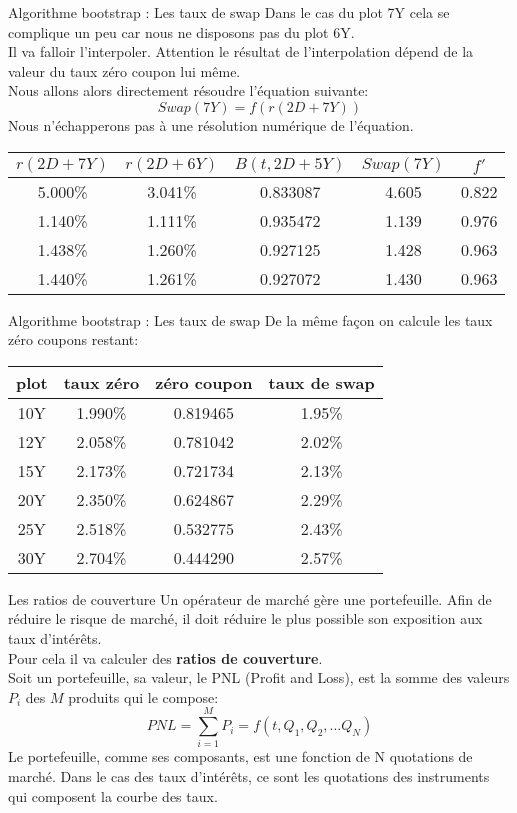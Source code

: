 \documentclass{beamer}
\begin{document}
\begin{frame}{Algorithme bootstrap : Les taux de swap}
Dans le cas du plot 7Y cela se complique un peu car nous ne disposons pas du plot 6Y.\\
Il va falloir l'interpoler. Attention le résultat de l'interpolation dépend de la valeur du taux zéro coupon lui même.\\
Nous allons alors directement résoudre l'équation suivante:
\[
Swap(7Y)=f(r(2D+7Y))
\]
\vspace{0.5cm}
Nous n'échapperons pas à une résolution numérique de l'équation.\\
\begin{tabular}{|c|c|c|c|c|}
\hline
$r(2D+7Y)$ & $r(2D+6Y)$ & $B(t,2D+5Y)$ & $Swap(7Y)$ & $f'$\\
\hline
5.000\% & 3.041\% & 0.833087 & 4.605 & 0.822\\ 
1.140\% & 1.111\% & 0.935472 & 1.139 & 0.976\\ 
1.438\% & 1.260\% & 0.927125 & 1.428 & 0.963\\ 
1.440\% & 1.261\% & 0.927072 & 1.430 & 0.963\\ 
\hline
\end{tabular}
\end{frame}

\begin{frame}{Algorithme bootstrap : Les taux de swap}
De la même façon on calcule les taux zéro coupons restant:
\begin{tabular}{|c|c|c|c|}
\hline
plot & taux zéro & zéro coupon & taux de swap \\
\hline
10Y & 1.990\% & 0.819465 & 1.95\% \\ 
12Y & 2.058\% & 0.781042 & 2.02\% \\ 
15Y & 2.173\% & 0.721734 & 2.13\% \\ 
20Y & 2.350\% & 0.624867 & 2.29\% \\ 
25Y & 2.518\% & 0.532775 & 2.43\% \\ 
30Y & 2.704\% & 0.444290 & 2.57\% \\ 
\hline
\end{tabular}
\end{frame}

\begin{frame}{Les ratios de couverture}
Un opérateur de marché gère une portefeuille. Afin de réduire le risque de marché, il doit réduire le plus possible son exposition aux taux d'intérêts.\\
Pour cela il va calculer des \textbf{ratios de couverture}.\\
Soit un portefeuille, sa valeur, le PNL (Profit and Loss), est la somme des valeurs $P_i$ des $M$ produits qui le compose:
\[
PNL=\sum_{i=1}^{M}P_i=f(t,Q_1,Q_2,...Q_N)
\]
Le portefeuille, comme ses composants, est une fonction de N quotations de marché. Dans le cas des taux d'intérêts, ce sont les quotations des instruments qui composent la courbe des taux.
\end{frame}
\end{document}
